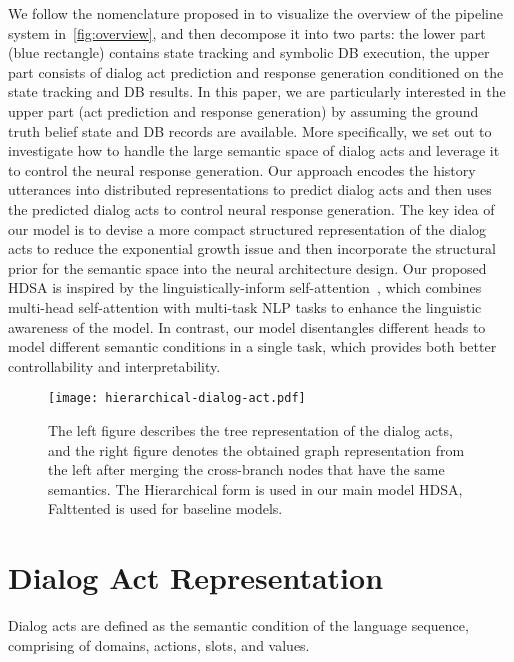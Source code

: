 \documentclass[11pt,a4paper]{article}
\begin{document}
We follow the nomenclature proposed in \citet{DBLP:conf/eacl/Rojas-BarahonaG17} to visualize the overview of the pipeline system in~\autoref{fig:overview}, and then decompose it into two parts: the lower part (blue rectangle) contains state tracking and symbolic DB execution, the upper part consists of dialog act prediction and response generation conditioned on the state tracking and DB results. In this paper, we are particularly interested in the upper part (act prediction and response generation) by assuming the ground truth belief state and DB records are available. More specifically, we set out to investigate how to handle the large semantic space of dialog acts and leverage it to control the neural response generation. Our approach encodes the history utterances into distributed representations to predict dialog acts and then uses the predicted dialog acts to control neural response generation. The key idea of our model is to devise a more compact structured representation of the dialog acts to reduce the exponential growth issue and then incorporate the structural prior for the semantic space into the neural architecture design. Our proposed HDSA is inspired by the linguistically-inform self-attention~\cite{DBLP:conf/emnlp/StrubellVAWM18}, which combines multi-head self-attention with multi-task NLP tasks to enhance the linguistic awareness of the model. In contrast, our model disentangles different heads to model different semantic conditions in a single task, which provides both better controllability and interpretability.
\begin{figure*}[thb]
    \begin{center}
    \texttt{[image: hierarchical-dialog-act.pdf]}
    \end{center}
    \caption{The left figure describes the tree representation of the dialog acts, and the right figure denotes the obtained  graph representation from the left after merging the cross-branch nodes that have the same semantics. The Hierarchical form is used in our main model HDSA, Falttented is used for baseline models. }
    \label{fig:dialog-act}
    \vspace{-2ex}
\end{figure*}

\section{Dialog Act Representation}
\label{sec:act}
Dialog acts are defined as the semantic condition of the language sequence, comprising of domains, actions, slots, and values. 
\end{document}
